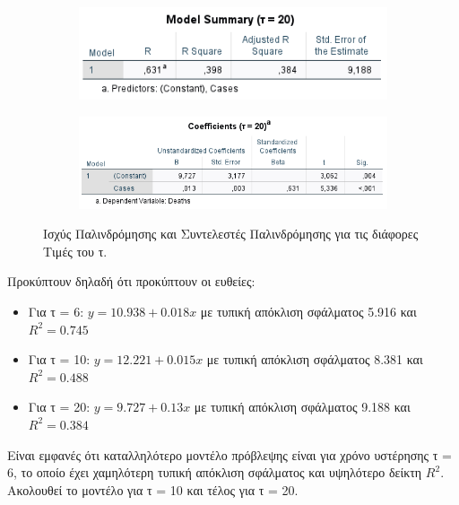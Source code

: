 \documentclass{article}
\begin{document}
\begin{figure}
\begin{subfigure}[b]{0.475\textwidth}
        \end{subfigure}
        \begin{subfigure}[b]{0.475\textwidth}   
            \centering 
            \includegraphics[width=\textwidth]{media/2/reg_t20_1.png}
        \end{subfigure}
        \hfill
        \begin{subfigure}[b]{0.475\textwidth}   
            \centering 
            \includegraphics[width=\textwidth]{media/2/reg_t20_2.png}
        \end{subfigure}
        \caption{Ισχύς Παλινδρόμησης και Συντελεστές Παλινδρόμησης για τις διάφορες Τιμές του τ.}
        \label{reg_t_tables}
    \end{figure}

    Προκύπτουν δηλαδή ότι προκύπτουν οι ευθείες:
    \begin{itemize}
        \item Για τ = 6: $ y = 10.938 + 0.018x $ με τυπική απόκλιση σφάλματος 5.916 και $ R^2 = 0.745 $
        \item Για τ = 10: $ y = 12.221 + 0.015x $ με τυπική απόκλιση σφάλματος 8.381 και $ R^2 = 0.488 $
        \item Για τ = 20: $ y = 9.727 + 0.13x $ με τυπική απόκλιση σφάλματος 9.188 και $ R^2 = 0.384 $
    \end{itemize}
    
    Eίναι εμφανές ότι καταλληλότερο μοντέλο πρόβλεψης είναι για χρόνο υστέρησης τ = 6, το οποίο έχει χαμηλότερη τυπική απόκλιση σφάλματος και υψηλότερο δείκτη $ R^2 $. Ακολουθεί το μοντέλο για τ = 10 και τέλος για τ = 20.
    
\newpage
\end{document}
